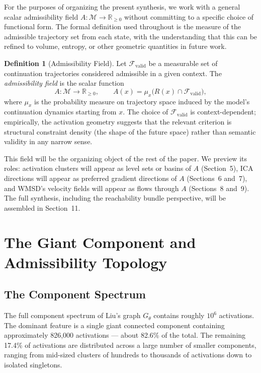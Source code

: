 \documentclass[12pt, a4paper]{article}
\theoremstyle{plain}
\theoremstyle{definition}
\newtheorem{definition}[theorem]{Definition}
\theoremstyle{remark}
\newcommand{\R}{\mathbb{R}}
\newcommand{\cM}{\mathcal{M}}
\newcommand{\cF}{\mathcal{F}}
\newcommand{\fA}{A}
\newcommand{\lra}{\longrightarrow}
\newcommand{\reachset}[1]{R(#1)}
\begin{document}
For the purposes of organizing the present synthesis, we work with a general
scalar admissibility field $\fA : \cM \to \R_{\geq 0}$ without committing to
a specific choice of functional form. The formal definition used throughout
is the measure of the admissible trajectory set from each state, with the
understanding that this can be refined to volume, entropy, or other geometric
quantities in future work.

\begin{definition}[Admissibility Field]
  Let $\cF_{\mathrm{valid}}$ be a measurable set of continuation trajectories
  considered admissible in a given context. The \emph{admissibility field} is
  the scalar function
  \begin{equation}
    \fA : \cM \lra \R_{\geq 0},
    \qquad
    \fA(x) = \mu_x\bigl(\reachset{x} \cap \cF_{\mathrm{valid}}\bigr),
  \end{equation}
  where $\mu_x$ is the probability measure on trajectory space induced by the
  model's continuation dynamics starting from $x$. The choice of
  $\cF_{\mathrm{valid}}$ is context-dependent; empirically, the activation
  geometry suggests that the relevant criterion is structural constraint density
  (the shape of the future space) rather than semantic validity in any narrow
  sense.
\end{definition}

This field will be the organizing object of the rest of the paper. We preview
its roles: activation clusters will appear as level sets or basins of $\fA$
(Section~5), ICA directions will appear as preferred gradient directions of
$\fA$ (Sections~6 and~7), and WMSD's velocity fields will appear as flows
through $\fA$ (Sections~8 and~9). The full synthesis, including the reachability
bundle perspective, will be assembled in Section~11.

\section{The Giant Component and Admissibility Topology}

\subsection{The Component Spectrum}

The full component spectrum of Liu's graph $G_\theta$ contains roughly $10^6$
activations. The dominant feature is a single giant connected component
containing approximately 826,000 activations --- about 82.6\% of the total.
The remaining 17.4\% of activations are distributed across a large number of
smaller components, ranging from mid-sized clusters of hundreds to thousands of
activations down to isolated singletons.
\end{document}
